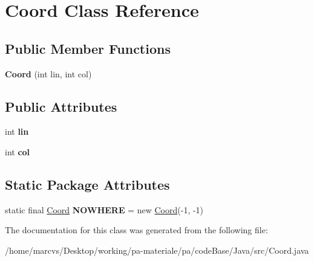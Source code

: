 \hypertarget{classCoord}{
\section{Coord Class Reference}
\label{classCoord}
}
\subsection*{Public Member Functions}
\begin{DoxyCompactItemize}
\item 
\hypertarget{classCoord_a0ce71339987902b336e340728de4a086}{
{\bfseries Coord} (int lin, int col)}
\label{classCoord_a0ce71339987902b336e340728de4a086}

\end{DoxyCompactItemize}
\subsection*{Public Attributes}
\begin{DoxyCompactItemize}
\item 
\hypertarget{classCoord_a0ab5a34fc4aa09f8cfb1eb7b5536361f}{
int {\bfseries lin}}
\label{classCoord_a0ab5a34fc4aa09f8cfb1eb7b5536361f}

\item 
\hypertarget{classCoord_a7d00b6fb4bfff6fe805b22ff918e21b0}{
int {\bfseries col}}
\label{classCoord_a7d00b6fb4bfff6fe805b22ff918e21b0}

\end{DoxyCompactItemize}
\subsection*{Static Package Attributes}
\begin{DoxyCompactItemize}
\item 
\hypertarget{classCoord_a06f517815dbcd255d655b4b65701a2bf}{
static final \hyperlink{classCoord}{Coord} {\bfseries NOWHERE} = new \hyperlink{classCoord}{Coord}(-\/1, -\/1)}
\label{classCoord_a06f517815dbcd255d655b4b65701a2bf}

\end{DoxyCompactItemize}


The documentation for this class was generated from the following file:\begin{DoxyCompactItemize}
\item 
/home/marcvs/Desktop/working/pa-\/materiale/pa/codeBase/Java/src/Coord.java\end{DoxyCompactItemize}
